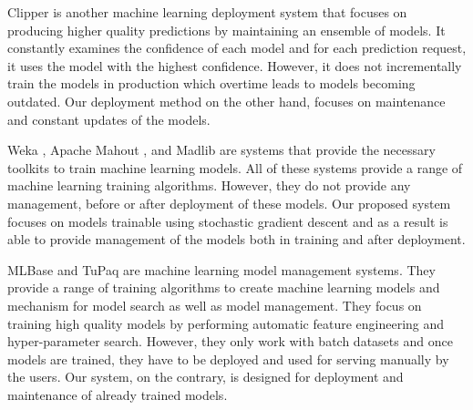 \documentclass{vldb}
\begin{document}
Clipper \cite{crankshaw2016clipper} is another machine learning deployment system that focuses on producing higher quality predictions by maintaining an ensemble of models.
It constantly examines the confidence of each model and for each prediction request, it uses the model with the highest confidence.
However, it does not incrementally train the models in production which overtime leads to models becoming outdated.
Our deployment method on the other hand, focuses on maintenance and constant updates of the models.

Weka \cite{hall2009weka}, Apache Mahout \cite{Owen:2011:MA:2132656}, and Madlib \cite{hellerstein2012madlib} are systems that provide the necessary toolkits to train machine learning models. All of these systems provide a range of machine learning training algorithms. 
However, they do not provide any management, before or after deployment of these models. 
Our proposed system focuses on models trainable using stochastic gradient descent and as a result is able to provide management of the models both in training and after deployment.

MLBase \cite{kraska2013mlbase} and TuPaq \cite{sparks2015tupaq} are machine learning model management systems.
They provide a range of training algorithms to create machine learning models and mechanism for model search as well as model management.
They focus on training high quality models by performing automatic feature engineering and hyper-parameter search.
However, they only work with batch datasets and once models are trained, they have to be deployed and used for serving manually by the users.
Our system, on the contrary, is designed for deployment and maintenance of already trained models.
\end{document}
